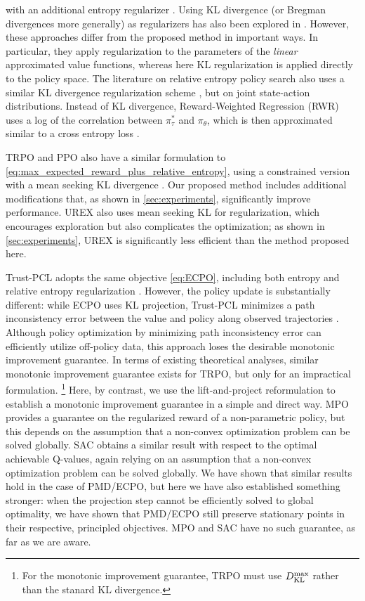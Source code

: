 with an additional entropy regularizer
\citep{williams1991function,fox2015taming,nachum2017bridging}.
Using KL divergence (or Bregman divergences more generally)
as regularizers has also been explored
in \citet{liu2015finite,thomas2013projected,mahadevan2012sparse}.
However, these approaches differ from the proposed method
in important ways.
In particular, they apply regularization to the parameters of the
\emph{linear} approximated value functions, whereas here KL regularization
is applied directly to the policy space.
The literature on relative entropy policy search also uses a similar
KL divergence regularization scheme
\citep{peters2010relative,van2015learning},
but on joint state-action distributions.
Instead of KL divergence, Reward-Weighted Regression (RWR) uses
a log of the correlation between $\pi^*_\tau$ and $\pi_\theta$,
which is then approximated similar to a cross entropy loss
\citep{peters2007reinforcement,wierstra2008episodic}.
\fi

TRPO and PPO also have a similar formulation to
\cref{eq:max_expected_reward_plus_relative_entropy},
using a constrained version with a mean seeking KL divergence
\cite{schulman2015trust,schulman2017proximal}. 
Our proposed method includes additional modifications that,
as shown in \cref{sec:experiments}, significantly improve performance.
UREX also uses mean seeking KL for regularization,
which encourages exploration but also complicates the optimization;
as shown in \cref{sec:experiments},
UREX is significantly less efficient than the method proposed here.

Trust-PCL adopts the same objective \cref{eq:ECPO},
including both entropy and relative entropy regularization
\citep{nachum2017trust}.
However, the policy update is substantially different:
while ECPO uses KL projection, Trust-PCL
minimizes a path inconsistency error
between the value and policy along observed trajectories
\citep{nachum2017bridging}.
Although policy optimization by minimizing path inconsistency error
can efficiently utilize off-policy data, this approach loses the 
desirable monotonic improvement guarantee.
\if
In terms of existing theoretical analyses, 
similar monotonic improvement guarantee exists for TRPO, but only for an
impractical formulation.%
%
\footnote{
	For the monotonic improvement guarantee,
	TRPO must use $D_{\mathrm{KL}}^{\max} $ rather than the stanard KL divergence.
} 
Here, by contrast,
we use the lift-and-project reformulation to establish a monotonic
improvement guarantee in a simple and direct way.
MPO provides a guarantee on the regularized reward of a non-parametric policy,
but this depends on the assumption that a non-convex optimization problem
can be solved globally.
SAC obtains a similar result with respect to the optimal achievable
Q-values, again relying on an assumption that a non-convex optimization
problem can be solved globally.
We have shown that similar results hold in the case of PMD/ECPO,
but here we have also established something stronger:
when the projection step cannot be efficiently solved to global optimality,
we have shown that PMD/ECPO still preserve stationary points in 
their respective, principled objectives.
MPO and SAC have no such guarantee, as far as we are aware. 
\fi

